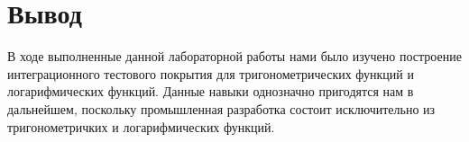 \section{Вывод}
В ходе выполненные данной лабораторной работы нами было изучено построение
интеграционного тестового покрытия для тригонометрических функций и логарифмических
функций.
Данные навыки однозначно пригодятся нам в дальнейшем, поскольку
промышленная разработка состоит исключительно из тригонометричких и логарифмических
функций.
